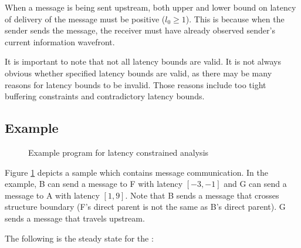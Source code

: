 When a message is being sent upstream, both upper and lower bound
on latency of delivery of the message must be positive ($l_0 \ge
1$). This is because when the sender sends the message, the
receiver must have already observed sender's current information
wavefront.

It is important to note that not all latency bounds are valid. It
is not always obvious whether specified latency bounds are valid,
as there may be many reasons for latency bounds to be invalid.
Those reasons include too tight buffering constraints and
contradictory latency bounds.

\subsection{Example}
\label{sec:constrained-example}

\begin{figure}
\centering {}
\caption{Example {\StreamIt} program for latency constrained
analysis} \label{fig:constrained-example}
\end{figure}

Figure \ref{fig:constrained-example} depicts a sample {\pipeline}
which contains message communication.  In the example, {\filter} B
can send a message to {\filter} F with latency $[-3,-1]$ and {\filter}
G can send a message to {\filter} A with latency $[1,9]$.  Note that
{\filter} B sends a message that crosses {\StreamIt} structure
boundary (F's direct parent is not the same as B's direct parent).
{\filter} G sends a message that travels upstream.

The following is the steady state for the {\pipeline}:

